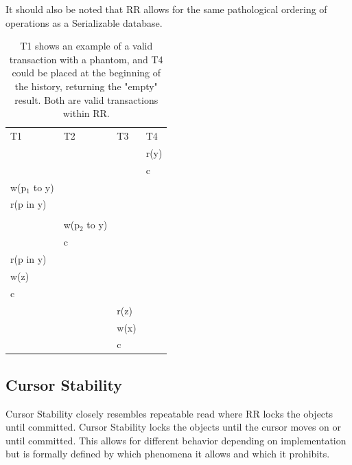 \documentclass[a4paper,10pt,titlepage]{report}
\begin{document}
    It should also be noted that RR allows for the same pathological ordering of operations as a Serializable database.

    \begin{table}[h]
        \begin{tabular}{l|l|l|l}
            T1            & T2            & T3   & T4   \\
            &               &      & r(y) \\
            &               &      & c    \\
            w(p$_1$ to y) &               &      &      \\
            r(p in y)     &               &      &      \\
            &               &      &      \\
            & w(p$_2$ to y) &      &      \\
            & c             &      &      \\
            r(p in y)     &               &      &      \\
            w(z)          &               &      &      \\
            c             &               &      &      \\
            &               & r(z) &      \\
            &               & w(x) &      \\
            &               & c    &
        \end{tabular}
        \caption{T1 shows an example of a valid transaction with a phantom, and T4 could be placed at the beginning of the history, returning the "empty" result. Both are valid transactions within RR.}
    \end{table}

    \subsection{Cursor Stability}
    Cursor Stability closely resembles repeatable read where RR locks the objects until committed. Cursor Stability locks the objects until the cursor moves on or until committed. This allows for different behavior depending on implementation but is formally defined by which phenomena it allows and which it prohibits.
\end{document}
